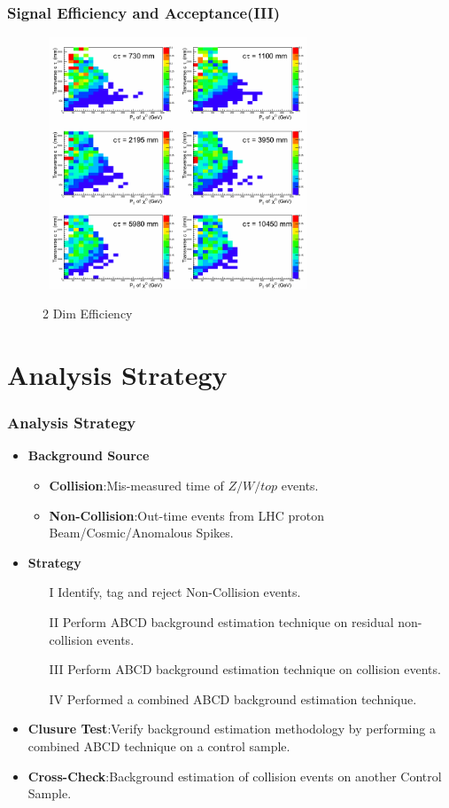 \documentclass{beamer}
\begin{document}
\begin{frame}
\frametitle{Signal Efficiency and Acceptance(III)}
  \begin{figure}[ht]
   \begin{minipage}[b]{0.7\linewidth}
    \mbox{
  \centering
  \includegraphics[height=7.5cm, width=0.65\paperwidth]{THESISPLOTS/Eff180_xPt_ct.png} }
    \vspace{-0.5cm}
    \caption{2 Dim Efficiency}
  \end{minipage}
 \end{figure}
\end{frame}

\section{Analysis Strategy}
\begin{frame}
\frametitle{\Huge{Analysis Strategy}}
\begin{itemize}
 \item \textcolor{UMN@Maroon}{\textbf{Background Source}}
  \begin{itemize}
   \item \textbf{Collision}:Mis-measured time of $Z/W/top$ events.
   \item \textbf{Non-Collision}:Out-time events from LHC proton Beam/Cosmic/Anomalous Spikes.
  \end{itemize}
 \item \textcolor{UMN@Maroon}{\textbf{Strategy}}
   \begin{enumerate}
    \item[I] Identify, tag and reject Non-Collision events.
    \item[II] Perform ABCD background estimation technique on residual non-collision events.
    \item[III]Perform ABCD background estimation technique on collision events.
    \item[IV] Performed a combined ABCD background estimation technique. 
    \end{enumerate}
 \item \textcolor{UMN@Maroon}{\textbf{Clusure Test}}:Verify background estimation methodology by performing a combined ABCD technique on a control sample.
 \item \textcolor{UMN@Maroon}{\textbf{Cross-Check}}:Background estimation of collision events on another Control Sample.
\end{itemize}  
\end{frame}
\end{document}
